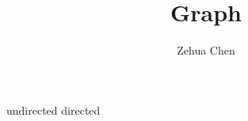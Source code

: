 \documentclass[11pt, letterpaper]{report}
\title{Graph}
\author{Zehua Chen}
\begin{document}
  \maketitle
  \tableofcontents

  {undirected}
  {directed}
\end{document}
